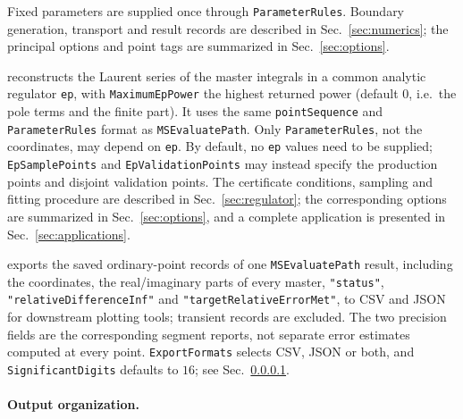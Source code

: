 \documentclass[11pt,a4paper]{article}
\numberwithin{table}{section}
\begin{document}
\begin{description}
        Fixed parameters are supplied once through \texttt{ParameterRules}. Boundary generation,
        transport and result records are described in Sec.~\ref{sec:numerics}; the principal
        options and point tags are summarized in Sec.~\ref{sec:options}.
  \item[\texttt{MSReconstructEpSeries[context, ep, pointSequence, opts]}] reconstructs the Laurent
        series of the master integrals in a common analytic regulator \texttt{ep}, with
        \texttt{MaximumEpPower} the highest returned power (default $0$, i.e.\ the pole terms and
        the finite part). It uses the same \texttt{pointSequence} and \texttt{ParameterRules}
        format as \texttt{MSEvaluatePath}. Only \texttt{ParameterRules}, not the coordinates,
        may depend on \texttt{ep}. By default, no \texttt{ep} values need to be supplied;
        \texttt{EpSamplePoints} and \texttt{EpValidationPoints} may instead specify the production
        points and disjoint validation points. The certificate conditions,
        sampling and fitting procedure are described in Sec.~\ref{sec:regulator}; the corresponding
        options are summarized in Sec.~\ref{sec:options}, and a complete application is
        presented in Sec.~\ref{sec:applications}.
  \item[\texttt{MSExportEvaluationData[evaluation, opts]}] exports the saved ordinary-point
        records of one \texttt{MSEvaluatePath} result, including the coordinates, the
        real/imaginary parts of every master, \texttt{"status"},
        \texttt{"relativeDifferenceInf"} and
        \texttt{"targetRelativeErrorMet"}, to CSV and JSON for downstream plotting tools; transient
        records are excluded. The two precision fields are the corresponding segment reports,
        not separate error estimates computed at every point. \texttt{ExportFormats} selects
        CSV, JSON or both, and \texttt{SignificantDigits} defaults to $16$;
        see Sec.~\ref{sec:outputs}.
\end{description}

\paragraph{Output organization.}
\label{sec:outputs}
\end{document}

